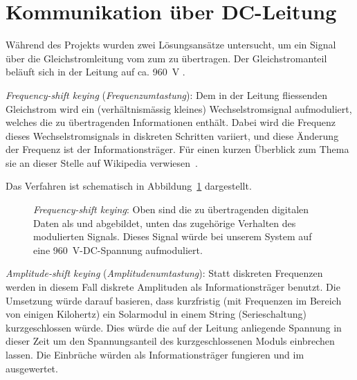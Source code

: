 \section{Kommunikation \"uber DC-Leitung}
\label{sec:hardware:dcLeitung}

W\"ahrend  des   Projekts  wurden   zwei  L\"osungsans\"atze   untersucht,  um
ein  Signal  \"uber   die  Gleichstromleitung  vom  \Sensor   zum  \Master  zu
\"ubertragen. Der  Gleichstromanteil   bel\"auft  sich  in  der   Leitung  auf
ca. \SI{960}{\volt} .

\myfancybreak

\emph{Frequency-shift    keying}   (\emph{Frequenzumtastung}): Dem    in   der
Leitung    fliessenden    Gleichstrom     wird    ein    (verh\"altnism\"assig
kleines)    Wechselstromsignal    aufmoduliert,
welches   die   zu   \"ubertragenden   Informationen   enth\"alt. Dabei   wird
die    Frequenz   dieses    Wechselstromsignals    in   diskreten    Schritten
variiert,     und  diese   \"Anderung  der  Frequenz   ist  der
Informationstr\"ager.  F\"ur einen kurzen \"Uberblick  zum Thema sie an dieser
Stelle auf Wikipedia verwiesen~\cite{ref:fsk:wikipedia}.

Das    Verfahren    ist   schematisch    in    Abbildung~\ref{fig:fsk:concept}
dargestellt.

\begin{figure}[h!tb]
    \centering
    
    \caption{%
        \emph{Frequency-shift  keying}: Oben   sind  die   zu  \"ubertragenden
        digitalen  Daten  als    und   abgebildet,  unten  das
        zugeh\"orige Verhalten des  modulierten Signals. Dieses Signal w\"urde
        bei unserem System auf eine \SI{960}{\volt}-DC-Spannung aufmoduliert.%
    }
    \label{fig:fsk:concept}
\end{figure}

\myfancybreak

\emph{Amplitude-shift  keying}  (\emph{Amplitudenumtastung}): Statt  diskreten
Frequenzen werden in diesem  Fall diskrete Amplituden als Informationstr\"ager
benutzt. Die   Umsetzung    w\"urde   darauf   basieren,    dass   kurzfristig
(mit   Frequenzen   im  Bereich   von   einigen   Kilohertz)  ein   Solarmodul
 in einem  String (Serieschaltung) kurzgeschlossen
w\"urde. Dies w\"urde die  auf der Leitung anliegende Spannung  in dieser Zeit
um  den Spannungsanteil  des kurzgeschlossenen  Moduls einbrechen  lassen. Die
Einbr\"uche  w\"urden  als  Informationstr\"ager   fungieren  und  im  \Master
ausgewertet.


